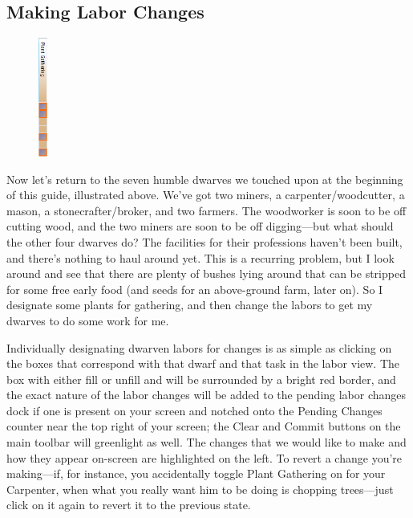 \documentclass[]{article}
\begin{document}
\subsection{Making Labor Changes}
\label{sec:Making Labor Changes}
\begin{figure}
\vspace{-22pt}
  \begin{center}
    \includegraphics[width=0.025\textwidth]{Sec2Fig2-1}
  \end{center}
\vspace{-10pt}
\end{figure}
Now let's return to the seven humble dwarves we touched upon at the beginning of this guide, illustrated
above. We've got two miners, a carpenter/woodcutter, a mason, a stonecrafter/broker, and two farmers. The
woodworker is soon to be off cutting wood, and the two miners are soon to be off digging---but what
should the other four dwarves do? The facilities for their professions haven't been built, and there's
nothing to haul around yet. This is a recurring problem, but I look around and see that there are plenty
of bushes lying around that can be stripped for some free early food (and seeds for an above-ground farm,
later on). So I designate some plants for gathering, and then change the labors to get my dwarves to do
some work for me.

Individually designating dwarven labors for changes is as simple as clicking on the boxes that correspond
with that dwarf and that task in the labor view. The box with either fill or unfill and will be
surrounded by a bright red border, and the exact nature of the labor changes will be added to the pending
labor changes dock if one is present on your screen and notched onto the Pending Changes counter near the
top right of your screen; the Clear and Commit buttons on the main toolbar will greenlight as well. The
changes that we would like to make and how they appear on-screen are highlighted on the left. To revert a
change you're making---if, for instance, you accidentally toggle Plant Gathering on for your Carpenter,
when what you really want him to be doing is chopping trees---just click on it again to revert it to the
previous state.
\end{document}
